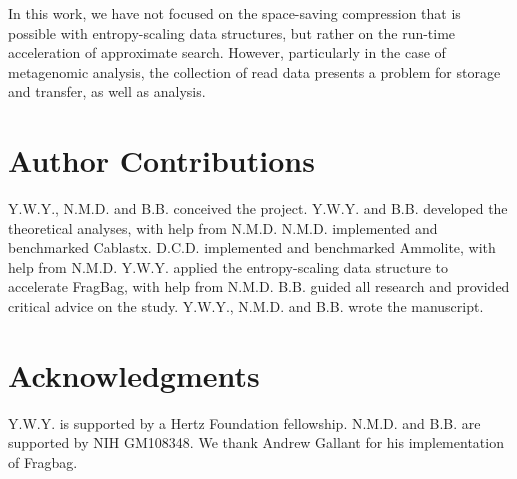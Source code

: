 \documentclass[review,preprint,12pt]{elsarticle}
\theoremstyle{definition}
\theoremstyle{remark}
\numberwithin{equation}{section}
\begin{document}
In this work, we have not focused on the space-saving compression that is
possible with entropy-scaling data structures, but rather on the run-time
acceleration of approximate search.
However, particularly in the case of metagenomic analysis, the collection of 
read data presents a problem for storage and transfer, as well as analysis.


\section{Author Contributions}
Y.W.Y., N.M.D. and B.B. conceived the project.
Y.W.Y. and B.B. developed the theoretical analyses, with help from N.M.D.
N.M.D. implemented and benchmarked Cablastx.
D.C.D. implemented and benchmarked Ammolite, with help from N.M.D.
Y.W.Y. applied the entropy-scaling data structure to accelerate FragBag, with help from N.M.D.
B.B. guided all research and provided critical advice on the study.
Y.W.Y., N.M.D. and B.B. wrote the manuscript.

\section{Acknowledgments}
Y.W.Y. is supported by a Hertz Foundation fellowship.
N.M.D. and B.B. are supported by NIH GM108348.
We thank Andrew Gallant for his implementation of Fragbag.


%

\end{document}
